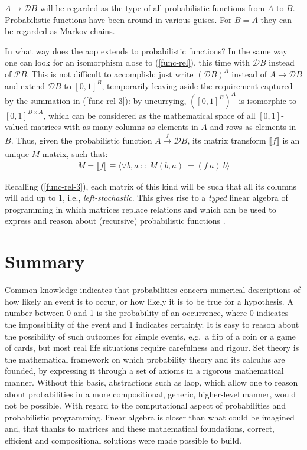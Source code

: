 \documentclass[
  oneside,
  11pt, a4paper,
  footinclude=true,
  headinclude=true,
  cleardoublepage=empty
]{scrbook}
\theoremstyle{definition}
\theoremstyle{definition}
\begin{document}
    \noindent $A \rightarrow \mathscr{D} B$ will be regarded as the type of all probabilistic functions from $A$ to $B$. Probabilistic functions have been around in various guises. For $B = A$ they can be regarded as Markov chains.
    
    In what way does the \gls{aop} extends to probabilistic functions? In the same way one can look for an isomorphism close to (\ref{func-rel}), this time with $\mathscr{D} B$ instead of $\mathscr{P} B$. This is not difficult to accomplish: just write $(\mathscr{D} B)^{A}$ instead of $A \rightarrow \mathscr{D} B$ and extend $\mathscr{D}B$ to $[0,1]^{B}$, temporarily leaving aside the requirement captured by the summation in (\ref{func-rel-3}): by uncurrying, $([0,1]^{B})^{A}$ is isomorphic to $[0,1]^{B \times A}$, which can be considered as the mathematical space of all $[0,1]$-valued matrices with as many columns as elements in $A$ and rows as elements in $B$. Thus, given the probabilistic function  $A \xrightarrow[]{f} \mathscr{D}B$, its matrix transform $\llbracket f \rrbracket$ is an unique $M$ matrix, such that:
    \begin{align}
        M = \llbracket f \rrbracket \equiv \langle \forall b,a\ ::\ M(b,a)\ = (f\ a)\ b \rangle
    \end{align}
    
    Recalling (\ref{func-rel-3}), each matrix of this kind will be such that all its columns will add up to $1$, i.e., \emph{left-stochastic}. This gives rise to a \emph{typed} linear algebra of programming in which matrices replace relations and which can be used to express and reason about (recursive) probabilistic functions \citep{oliveira2012towards}.
    
    \section{Summary}
    
    Common knowledge indicates that probabilities concern numerical descriptions of how likely an event is to occur, or how likely it is to be true for a hypothesis. A number between 0 and 1 is the probability of an occurrence, where 0 indicates the impossibility of the event and 1 indicates certainty. It is easy to reason about the possibility of such outcomes for simple events, e.g.\ a flip of a coin or a game of cards, but most real life situations require carefulness and rigour. 
    Set theory is the mathematical framework on which probability theory and its calculus are founded, by expressing it through a set of axioms in a rigorous mathematical manner. Without this basis, abstractions such as \gls{laop}, which allow one to reason about probabilities in a more compositional, generic, higher-level manner, would not be possible. With regard to the computational aspect of probabilities and probabilistic programming, linear algebra is closer than what could be imagined and, that thanks to matrices and these mathematical foundations, correct, efficient and compositional solutions were made possible to build.
    
\end{document}
